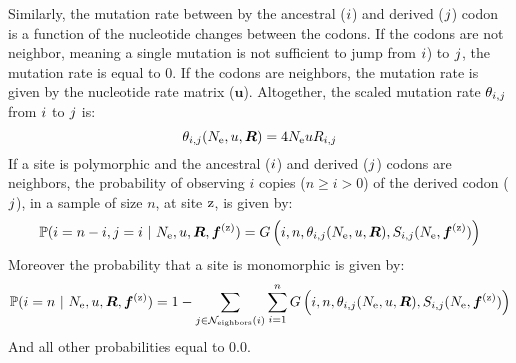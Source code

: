 Similarly, the mutation rate between by the ancestral (${i}$) and derived (${j}$) codon is a function of the nucleotide changes between the codons. If the codons are not neighbor, meaning a single mutation is not sufficient to jump from ${i}$) to ${j}$, the mutation rate is equal to $0$. If the codons are neighbors, the mutation rate is given by the nucleotide rate matrix ($ \bm{u} $). Altogether, the scaled mutation rate $\theta_{{i}, {j}}$ from ${i}$ to ${j}$ is:
\begin{equation}
	\theta_{{i}, {j}}(N_{\textrm{e}}, u, \bm{R}) = 4 N_{\textrm{e}} u R_{{i}, {j}}
\end{equation}
If a site is polymorphic and the ancestral (${i}$) and derived (${j}$) codons are neighbors, the probability of observing $i$ copies ($n \geq i > 0$) of the derived codon (${j}$), in a sample of size $n$, at site $\text{z}$, is given by:
\begin{equation}
	\mathbb{P} ({i}=n-i,{j}=i \ |\ N_{\textrm{e}}, u, \bm{R}, \bm{f}^{(\text{z})}) = G\left(i, n, \theta_{{i}, {j}}(N_{\textrm{e}}, u, \bm{R}), S_{{i}, {j}}(N_{\textrm{e}}, \bm{f}^{(\text{z})}) \right)
\end{equation}
Moreover the probability that a site is monomorphic is given by:
\begin{equation}
	\mathbb{P} ({i}= n \ |\ N_{\textrm{e}}, u, \bm{R}, \bm{f}^{(\text{z})}) = 1 - \sum\limits_{{j} \in \mathcal{N}_{\mathrm{eighbors}}\left({i}\right)} \sum\limits_{i=1}^{n} G\left(i, n, \theta_{{i}, {j}}(N_{\textrm{e}}, u, \bm{R}), S_{{i}, {j}}(N_{\textrm{e}}, \bm{f}^{(\text{z})})\right)
\end{equation}
And all other probabilities equal to $0.0$.
